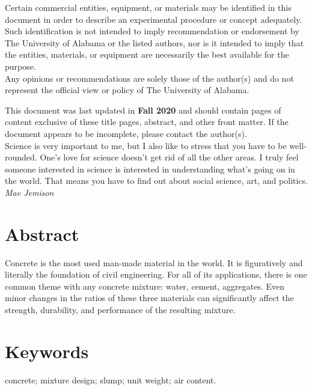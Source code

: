 \documentclass[12pt]{article}
\newcommand{\LastUpdate}{Fall 2020}
\begin{document}
\begin{titlepage}
\begin{center}
\normalsize 
Certain commercial entities, equipment, or materials may be identified in this document in order to describe an experimental procedure or concept adequately. Such identification is not intended to imply recommendation or endorsement by The University of Alabama or the listed authors, nor is it intended to imply that the entities, materials, or equipment are necessarily the best available for the purpose.\\
\vfill
Any opinions or recommendations are solely those of the author(s) and do not represent the official view or policy of The University of Alabama.
\end{center}
\begin{flushright}
\vfill
\normalsize 
This document was last updated in \textbf{\LastUpdate} and should contain \textbf{\pageref{LastPage}} pages of content exclusive of these title pages, abstract, and other front matter. If the document appears to be incomplete, please contact the author(s).\\
\vfill
Science is very important to me, but I also like to stress that you have to be well-rounded. One's love for science doesn't get rid of all the other areas. I truly feel someone interested in science is interested in understanding what's going on in the world. That means you have to find out about social science, art, and politics.\\
\textit{Mae Jemison}
\end{flushright}
\end{titlepage}
\section*{Abstract}
\normalsize Concrete is the most used man-made material in the world. It is figuratively and literally the foundation of civil engineering. For all of its applications, there is one common theme with any concrete mixture: water, cement, aggregates. Even minor changes in the ratios of these three materials can significantly affect the strength, durability, and performance of the resulting mixture.

\vfill
\section*{Keywords}
\normalsize concrete; mixture design; slump; unit weight; air content.\\
\pagebreak
\begin{center}
\tableofcontents
\pagebreak
\listoftables
\listoffigures
\end{center}
\pagebreak
\end{document}
